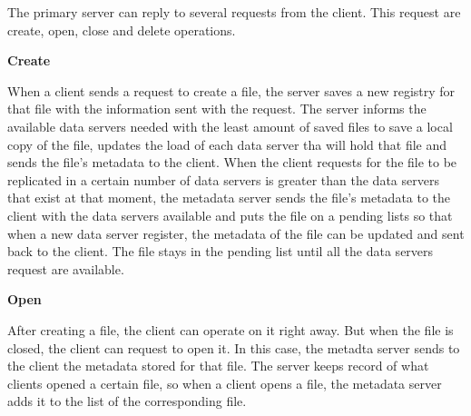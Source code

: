 The primary server can reply to several requests from the client. This
request are create, open, close and delete operations.

\medskip
\textbf{Create}
\smallskip 

When a client sends a request to create a file, the server saves a new
registry for that file with the information sent with the request. The
server informs the available data servers needed with the least amount
of saved files to save a local copy of the file, updates the load
of each data server tha will hold that file and sends the file's metadata
to the client. When the client requests for the file to be replicated in
a certain number of data servers is greater than the data servers that 
exist at that moment, the metadata server sends the file's metadata to 
the client with the data servers available and puts the file on a pending 
lists so that when a new data server register, the metadata of the file 
can be updated and sent back to the client. The file stays in the pending 
list until all the data servers request are available.


\bigskip
\textbf{Open}
\smallskip

After creating a file, the client can operate on it right away. But when
the file is closed, the client can request to open it. In this case, the
metadta server sends to the client the metadata stored for that file. The
server keeps record of what clients opened a certain file, so when a client
opens a file, the metadata server adds it to the list of the corresponding
file.


